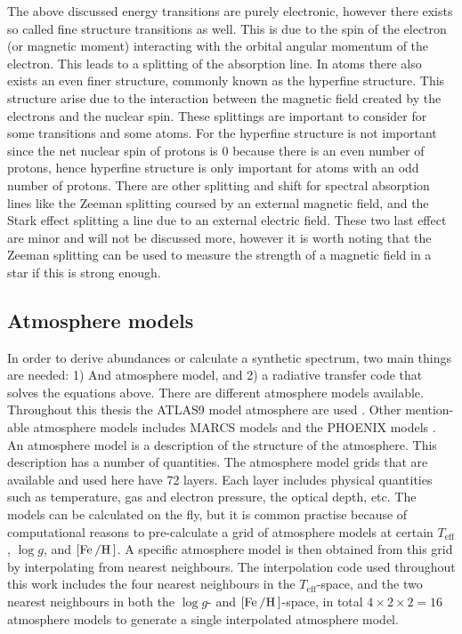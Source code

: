 The above discussed energy transitions are purely electronic, however there exists so called fine
structure transitions as well. This is due to the spin of the electron (or magnetic moment)
interacting with the orbital angular momentum of the electron. This leads to a splitting of the
absorption line. In atoms there also exists an even finer structure, commonly known as the hyperfine
structure. This structure arise due to the interaction between the magnetic field created by the
electrons and the nuclear spin. These splittings are important to consider for some transitions and
some atoms. For  the hyperfine structure is not important since the net nuclear spin of
protons is 0 because there is an even number of protons, hence hyperfine structure is only important
for atoms with an odd number of protons. There are other splitting and shift for spectral absorption
lines like the Zeeman splitting coursed by an external magnetic field, and the Stark effect
splitting a line due to an external electric field. These two last effect are minor and will not be
discussed more, however it is worth noting that the Zeeman splitting can be used to measure the
strength of a magnetic field in a star if this is strong enough.



\subsection{Atmosphere models}
\label{sec:atmospheremodels}

In order to derive abundances or calculate a synthetic spectrum, two main things are needed: 1) And
atmosphere model, and 2) a radiative transfer code that solves the equations above. There are
different atmosphere models available. Throughout this thesis the ATLAS9 model atmosphere are used
\citep{Kurucz1993}. Other mention-able atmosphere models includes MARCS models \citep{Gustafson2008}
and the PHOENIX models \citep{Husser2013}. An atmosphere model is a description of the structure of
the atmosphere. This description has a number of quantities. The atmosphere model grids that are
available and used here have 72 layers. Each layer includes physical quantities such as temperature,
gas and electron pressure, the optical depth, etc. The models can be calculated on the fly, but it
is common practise because of computational reasons to pre-calculate a grid of atmosphere models at
certain $T_\mathrm{eff}$, $\log g$, and $[\ion{Fe}/\ion{H}]$. A specific atmosphere model is then
obtained from this grid by interpolating from nearest neighbours. The interpolation code used
throughout this work includes the four nearest neighbours in the $T_\mathrm{eff}$-space, and the two
nearest neighbours in both the $\log g$- and $[\ion{Fe}/\ion{H}]$-space, in total
$4\times2\times2=16$ atmosphere models to generate a single interpolated atmosphere model.




